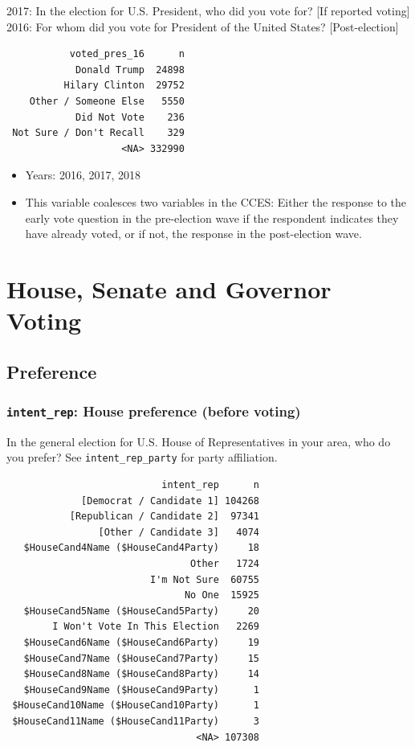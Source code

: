 \documentclass[10pt,article,oneside]{memoir}
\theoremstyle{definition}
\begin{document}
2017: In the election for U.S. President, who did you vote for? {[}If
reported voting{]} 2016: For whom did you vote for President of the
United States? {[}Post-election{]}

\begin{verbatim}
           voted_pres_16      n
            Donald Trump  24898
          Hilary Clinton  29752
    Other / Someone Else   5550
            Did Not Vote    236
 Not Sure / Don't Recall    329
                    <NA> 332990
\end{verbatim}

\begin{itemize}
\tightlist
\item
  Years: 2016, 2017, 2018
\item
  This variable coalesces two variables in the CCES: Either the response
  to the early vote question in the pre-election wave if the respondent
  indicates they have already voted, or if not, the response in the
  post-election wave.
\end{itemize}

\hypertarget{house-senate-and-governor-voting}{%
\section{House, Senate and Governor
Voting}\label{house-senate-and-governor-voting}}

\hypertarget{preference}{%
\subsection{Preference}\label{preference}}

\hypertarget{intent_rep-house-preference-before-voting}{%
\subsubsection{\texorpdfstring{\texttt{intent\_rep}: House preference
(before
voting)}{intent\_rep: House preference (before voting)}}\label{intent_rep-house-preference-before-voting}}

In the general election for U.S. House of Representatives in your area,
who do you prefer? See \texttt{intent\_rep\_party} for party
affiliation.

\begin{verbatim}
                           intent_rep      n
             [Democrat / Candidate 1] 104268
           [Republican / Candidate 2]  97341
                [Other / Candidate 3]   4074
   $HouseCand4Name ($HouseCand4Party)     18
                                Other   1724
                         I'm Not Sure  60755
                               No One  15925
   $HouseCand5Name ($HouseCand5Party)     20
        I Won't Vote In This Election   2269
   $HouseCand6Name ($HouseCand6Party)     19
   $HouseCand7Name ($HouseCand7Party)     15
   $HouseCand8Name ($HouseCand8Party)     14
   $HouseCand9Name ($HouseCand9Party)      1
 $HouseCand10Name ($HouseCand10Party)      1
 $HouseCand11Name ($HouseCand11Party)      3
                                 <NA> 107308
\end{verbatim}
\end{document}
